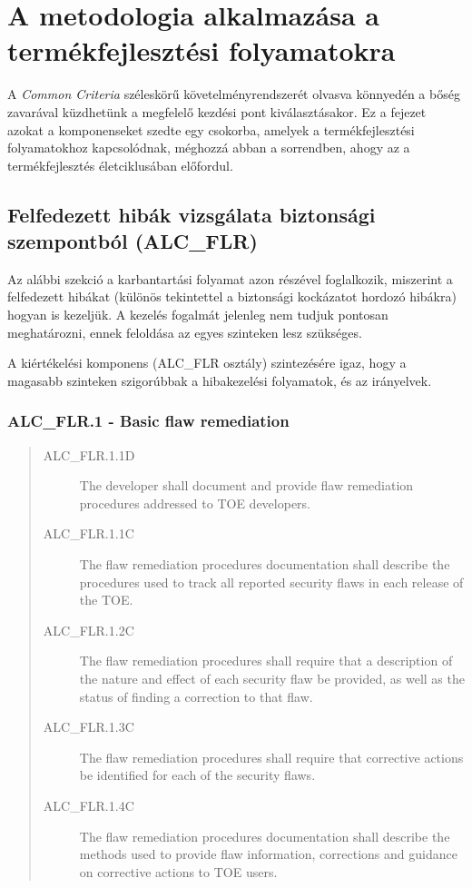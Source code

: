 \chapter{A metodologia alkalmazása a termékfejlesztési folyamatokra}

A \emph{Common Criteria} széleskörű követelményrendszerét olvasva könnyedén a bőség zavarával
küzdhetünk a megfelelő kezdési pont kiválasztásakor. Ez a fejezet azokat a komponenseket szedte egy
csokorba, amelyek a termékfejlesztési folyamatokhoz kapcsolódnak, méghozzá abban a sorrendben, ahogy
az a termékfejlesztés életciklusában előfordul.

\section{Felfedezett hibák vizsgálata biztonsági szempontból (ALC\_FLR)}

Az alábbi szekció a karbantartási folyamat azon részével foglalkozik, miszerint a felfedezett
hibákat (különös tekintettel a biztonsági kockázatot hordozó hibákra) hogyan is kezeljük. A kezelés
fogalmát jelenleg nem tudjuk pontosan meghatározni, ennek feloldása az egyes szinteken lesz
szükséges.

A kiértékelési komponens (ALC\_FLR osztály) szintezésére igaz, hogy a magasabb szinteken
szigorúbbak a hibakezelési folyamatok, és az irányelvek.

\subsection{ALC\_FLR.1 - Basic flaw remediation}
\begin{quote}
    \begin{description}
        \item[ALC\_FLR.1.1D]{The developer shall document and provide flaw remediation procedures
            addressed to TOE developers.}
        \item[ALC\_FLR.1.1C]{The flaw remediation procedures documentation shall describe the
            procedures used to track all reported security flaws in each release of the TOE.}
        \item[ALC\_FLR.1.2C]{The flaw remediation procedures shall require that a description of the
            nature and effect of each security flaw be provided, as well as the status of finding
            a correction to that flaw.}
        \item[ALC\_FLR.1.3C]{The flaw remediation procedures shall require that corrective actions
            be identified for each of the security flaws.}
        \item[ALC\_FLR.1.4C]{The flaw remediation procedures documentation shall describe the
            methods used to provide flaw information, corrections and guidance on corrective actions
            to TOE users.}
    \end{description}
\end{quote}


